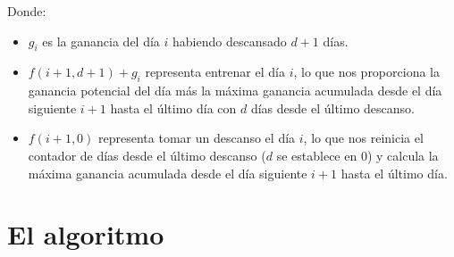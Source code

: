 \documentclass{estilo}
\begin{document}
Donde:
\begin{itemize}
    \item $g_i$ es la ganancia del día $i$ habiendo descansado $d+1$ días.
    \item $f(i+1, d+1) + g_i $ representa entrenar el día $i$, lo que nos proporciona la ganancia potencial del día más la máxima ganancia acumulada desde el día siguiente $i+1$ hasta el último día con $d$ días desde el último descanso. 
    \item $f(i+1, 0)$ representa tomar un descanso el día $i$, lo que nos reinicia el contador de días desde el último descanso ($d$ se establece en 0) y calcula la máxima ganancia acumulada desde el día siguiente $i+1$ hasta el último día.
\end{itemize}




\newpage

\section{El algoritmo}
\end{document}
